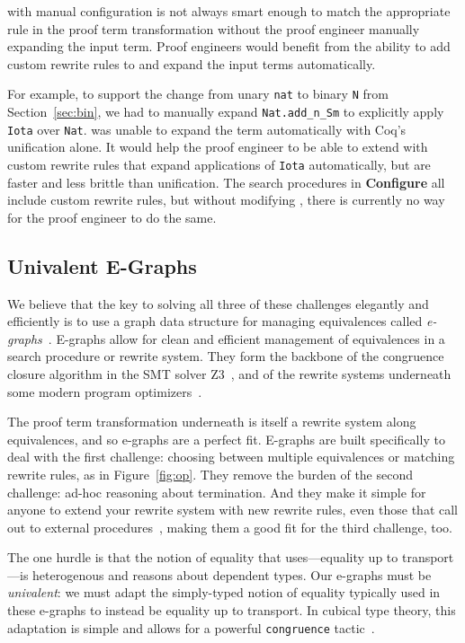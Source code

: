 \toolname with manual configuration is not always smart enough to match the appropriate rule in the proof term
transformation without the proof engineer manually expanding the input term.
Proof engineers would benefit from the ability to add custom rewrite rules to \toolname
and expand the input terms automatically.

For example, to support the change from unary \lstinline{nat} to binary \lstinline{N}
from Section~\ref{sec:bin}, we had to manually expand \lstinline{Nat.add_n_Sm}
to explicitly apply \lstinline{Iota} over \lstinline{Nat}.
\toolname was unable to expand the term automatically with Coq's unification alone.
It would help the proof engineer to be able to extend \toolname with custom rewrite
rules that expand applications of \lstinline{Iota} automatically, but are faster and less brittle than unification.
The search procedures in \textbf{Configure} all include custom rewrite rules, but
without modifying \toolname, there is currently no way for the proof engineer to do the same.

\subsection{Univalent E-Graphs}
\label{sec:egraph}

We believe that the key to solving all three of these challenges elegantly and efficiently is to use
a graph data structure for managing equivalences called \textit{e-graphs}~\cite{egraph1}.
E-graphs allow for clean and efficient management of equivalences in a search procedure or rewrite system.
They form the backbone of the congruence closure algorithm in the SMT solver Z3~\cite{egraph4},
and of the rewrite systems underneath some modern program optimizers~\cite{egraph2, egraph3}.

The proof term transformation underneath \toolname is itself a rewrite system along equivalences,
and so e-graphs are a perfect fit.
E-graphs are built specifically to deal with the first challenge:
choosing between multiple equivalences or matching rewrite rules,
as in Figure~\ref{fig:op}.
They remove the burden of the second challenge: ad-hoc reasoning about termination.
And they make it simple for anyone to extend your rewrite system with new
rewrite rules, even those that call out
to external procedures~\cite{egraph5}, making them a good fit for the third challenge, too.

The one hurdle is that the notion of equality that \toolname uses---equality up to transport---is heterogenous and reasons 
about dependent types. Our e-graphs must be \textit{univalent}: we must adapt the simply-typed notion of equality typically
used in these e-graphs to instead be equality up to transport.
In cubical type theory, this adaptation is simple and allows for a powerful \lstinline{congruence} tactic~\cite{egraph6}.


